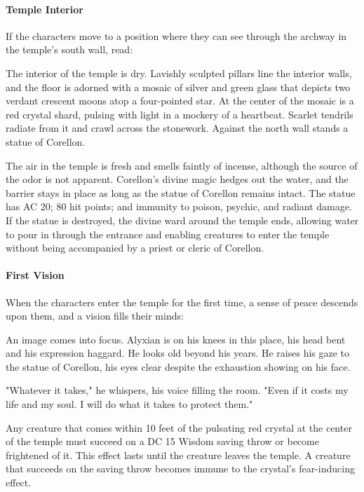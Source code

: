 \documentclass[10pt,a4paper,twoside,twocolumn,openany,nodeprecatedcode]{dndbook}
\begin{document}
\paragraph{Temple Interior}
If the characters move to a position where they can see through the archway in the temple's south wall, read:

\begin{DndReadAloud}{}
The interior of the temple is dry. Lavishly sculpted pillars line the interior walls, and the floor is adorned with a mosaic of silver and green glass that depicts two verdant crescent moons atop a four-pointed star. At the center of the mosaic is a red crystal shard, pulsing with light in a mockery of a heartbeat. Scarlet tendrils radiate from it and crawl across the stonework. Against the north wall stands a statue of Corellon.

\end{DndReadAloud}

The air in the temple is fresh and smells faintly of incense, although the source of the odor is not apparent. Corellon's divine magic hedges out the water, and the barrier stays in place as long as the statue of Corellon remains intact. The statue has AC 20; 80 hit points; and immunity to poison, psychic, and radiant damage. If the statue is destroyed, the divine ward around the temple ends, allowing water to pour in through the entrance and enabling creatures to enter the temple without being accompanied by a priest or cleric of Corellon.

\paragraph{First Vision}
When the characters enter the temple for the first time, a sense of peace descends upon them, and a vision fills their minds:

\begin{DndReadAloud}{}
An image comes into focus. Alyxian is on his knees in this place, his head bent and his expression haggard. He looks old beyond his years. He raises his gaze to the statue of Corellon, his eyes clear despite the exhaustion showing on his face.

"Whatever it takes," he whispers, his voice filling the room. "Even if it costs my life and my soul. I will do what it takes to protect them."

\end{DndReadAloud}

Any creature that comes within 10 feet of the pulsating red crystal at the center of the temple must succeed on a DC 15 Wisdom saving throw or become frightened of it. This effect lasts until the creature leaves the temple. A creature that succeeds on the saving throw becomes immune to the crystal's fear-inducing effect.
\end{document}
